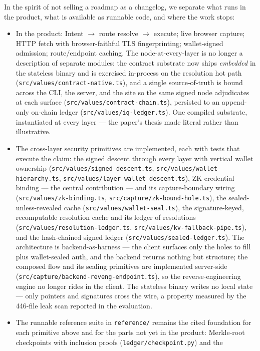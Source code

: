 \documentclass[11pt]{article}
\begin{document}
In the spirit of not selling a roadmap as a changelog, we separate what runs in the
product, what is available as runnable code, and where the work stops:
\begin{itemize}[leftmargin=1.4em]
\item In the product: Intent $\to$ route resolve $\to$ execute; live browser capture; HTTP
fetch with browser-faithful TLS fingerprinting; wallet-signed admission;
route/endpoint caching. The node-at-every-layer is no longer a description of
separate modules: the contract substrate now ships \emph{embedded} in the stateless
binary and is exercised in-process on the resolution hot path
(\texttt{src/values/contract-native.ts}), and a single source-of-truth is bound across
the CLI, the server, and the site so the same signed node adjudicates at each surface
(\texttt{src/values/contract-chain.ts}), persisted to an append-only on-chain ledger
(\texttt{src/values/iq-ledger.ts}). One compiled substrate, instantiated at every layer
--- the paper's thesis made literal rather than illustrative.
\item The cross-layer security primitives are implemented, each with
tests that execute the claim: the signed descent through every layer with vertical
wallet ownership (\texttt{src/values/signed-descent.ts}, \texttt{src/values/wallet-hierarchy.ts},
\texttt{src/values/layer-wallet-descent.ts}), ZK credential binding --- the central
contribution --- and its capture-boundary wiring (\texttt{src/values/zk-binding.ts},
\texttt{src/capture/zk-bound-hole.ts}), the sealed-unless-revealed cache
(\texttt{src/values/wallet-seal.ts}), the signature-keyed, recomputable resolution
cache and its ledger of resolutions (\texttt{src/values/resolution-ledger.ts},
\texttt{src/values/kv-fallback-pipe.ts}), and the hash-chained signed ledger
(\texttt{src/values/sealed-ledger.ts}). The architecture is
backend-as-harness --- the client surfaces only the holes to fill plus wallet-sealed
auth, and the backend returns nothing but structure; the composed flow and its
sealing primitives are implemented server-side
(\texttt{src/capture/backend-reveng-endpoint.ts}), so the reverse-engineering engine
no longer rides in the client. The stateless binary writes no local state --- only
pointers and signatures cross the wire, a property measured by the 446-file leak
scan reported in the evaluation.
\item The runnable reference suite in \texttt{reference/} remains the
cited foundation for each primitive above and for the parts not yet in the product:
Merkle-root checkpoints with inclusion proofs (\texttt{ledger/checkpoint.py}) and the

\end{itemize}
\end{document}

